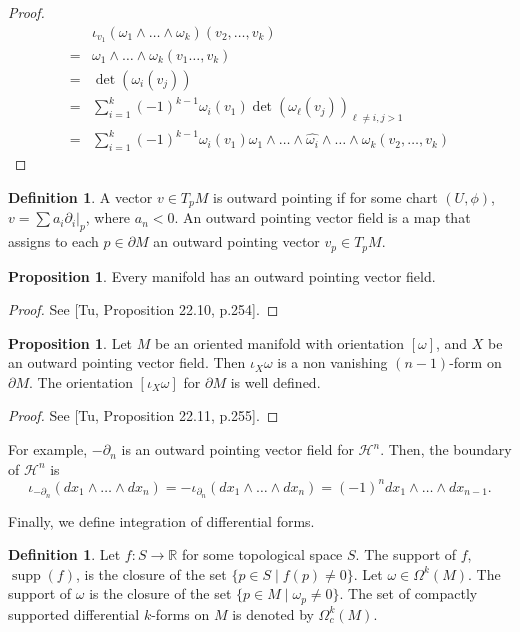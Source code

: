 \documentclass[]{article}
\DeclareMathOperator{\Det}{det}
\DeclareMathOperator{\supp}{supp}
\theoremstyle{definition}
\theoremstyle{definition}
\newtheorem{definition}[theorem]{Definition} %
\newtheorem{proposition}[theorem]{Proposition}
\begin{document}
\begin{proof}
    \begin{align*}
        &\iota_{v_1}(\omega_1\wedge \dots\wedge \omega_k)(v_2, \dots, v_k)\\
        =&\omega_1\wedge\dots\wedge\omega_k(v_1\dots, v_k)\\
        =&\Det(\omega_i(v_j))\\
        =&\sum_{i=1}^k(-1)^{k-1}\omega_i(v_1)\Det(\omega_\ell(v_j))_{\ell\neq i, j>1}\\
        =&\sum_{i=1}^k (-1)^{k-1}\omega_i(v_1)\omega_1\wedge\dots\wedge\widehat{\omega_i}\wedge\dots\wedge\omega_k(v_2, \dots, v_k)
    \end{align*}
\end{proof}

\begin{definition}
    A vector $v\in T_pM$ is outward pointing if for some chart $(U, \phi)$, $v=\sum a_i\partial_i|_p$, where $a_n<0$. An outward pointing vector field is a map that assigns to each $p\in \partial M$ an outward pointing vector $v_p\in T_pM$.
\end{definition}

\begin{proposition}
    Every manifold has an outward pointing vector field.
\end{proposition}
\begin{proof}
    See [Tu, Proposition 22.10, p.254].
\end{proof}

\begin{proposition}
    Let $M$ be an oriented manifold with orientation $[\omega]$, and $X$ be an outward pointing vector field. Then $\iota_X\omega$ is a non vanishing $(n-1)$-form on $\partial M$. The orientation $[\iota_X\omega]$ for $\partial M$ is well defined.
\end{proposition}

\begin{proof}
    See [Tu, Proposition 22.11, p.255].
\end{proof}

For example, $-\partial_n$ is an outward pointing vector field for $\mathcal{H}^n$. Then, the boundary of $\mathcal{H}^n$ is \[\iota_{-\partial_n}(dx_1\wedge\dots\wedge dx_n)=-\iota_{\partial_n}(dx_1\wedge\dots\wedge dx_n)=(-1)^ndx_1\wedge\dots\wedge dx_{n-1}.\]

Finally, we define integration of differential forms.

\begin{definition}
    Let $f:S \rightarrow \mathbb{R}$ for some topological space $S$. The support of $f$, $\supp(f)$, is the closure of the set $\{p\in S\mid f(p)\neq 0\}$. Let $\omega\in \Omega^k(M)$. The support of $\omega$ is the closure of the set $\{p\in M\mid \omega_p\neq 0\}$. The set of compactly supported differential $k$-forms on $M$ is denoted by $\Omega^k_c(M)$.
\end{definition}
\end{document}
